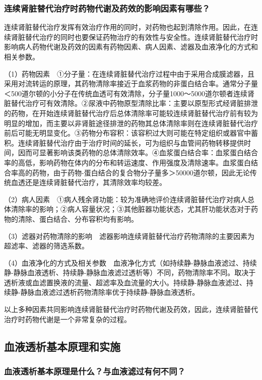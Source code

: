 \subsubsection{连续肾脏替代治疗时药物代谢及药效的影响因素有哪些？}

连续肾脏替代治疗发挥有效治疗作用的同时，对药物也起到清除作用。因此，在连续肾脏替代治疗的同时也要保证药物治疗的有效性与安全性。连续肾脏替代治疗时影响病人药物代谢及药效的因素有药物因素、病人因素、滤器及血液净化的方式和相关参数。

（1）药物因素　①分子量：在连续肾脏替代治疗过程中由于采用合成膜滤器，且采用对流转运的原理，其药物清除率接近于血浆药物的非蛋白结合率。通常分子量＜500道尔顿的小分子在传统血透可有效清除，分子量1000～5000道尔顿者连续肾脏替代治疗可有效清除。②尿液中药物原型清除比率：主要以原型形式经肾脏排泄的药物，在开始连续肾脏替代治疗后总体清除率可能较连续肾脏替代治疗前有较为明显的增加，而主要以非肾脏途径排泄的药物其总体清除率则在连续肾脏替代治疗前后可能无明显变化。③药物分布容积：该容积过大则可能在特定组织或器官中蓄积。连续肾脏替代治疗由于治疗时间的延长，可为组织与血管间药物转移提供时间，因而可显著影响该类药物的总体清除效率。④血浆蛋白结合率：血浆蛋白结合率的高低，影响药物在体内的分布和转运速度、作用强度及清除速率。血浆蛋白结合率高的药物，由于药物-蛋白结合的复合物分子量多＞50000道尔顿，因此无论传统血透还是连续肾脏替代治疗，其清除效率均较差。

（2）病人因素　①病人残余肾功能：较为准确地评价连续肾脏替代治疗对病人总体清除率的影响；②病人容量状况；③其他脏器功能状态，尤其肝功能状态对于药物的清除、蛋白结合、分布容积均有影响。

（3）滤器对药物清除的影响　滤器影响连续肾脏替代治疗药物清除的主要因素为超滤率、滤器的筛选系数。

（4）血液净化的方式及相关参数　血液净化方式（如持续静-静脉血液滤过、持续静-静脉血液透析、持续静-静脉血液滤过透析等）不同，药物清除率不同。取决于透析液或血滤置换液的流量、超滤率及血流量的大小。持续静-静脉血液滤过、持续静-静脉血液滤过透析药物清除率优于持续静-静脉血液透析。

以上多种因素共同影响连续肾脏替代治疗时药物代谢及药效，因此，连续肾脏替代治疗时药物代谢是一个非常复杂的过程。

\subsection{血液透析基本原理和实施}

\subsubsection{血液透析基本原理是什么？与血液滤过有何不同？}

